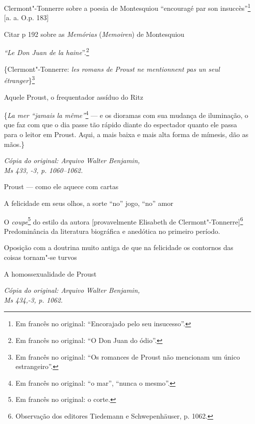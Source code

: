 Clermont"-Tonnerre sobre a poesia de Montesquiou ``encouragé par son
insuccès''\footnote{Em francês no original: ``Encorajado pelo seu insucesso''. \versal{[N.~T.]}} {[}a. a. O.p. 183{]}

Citar p 192 sobre as \emph{Memórias} (\emph{Memoiren}) de Montesquiou

\emph{``Le Don Juan de la haine}''.\footnote{Em francês no original: ``O Don Juan do ódio''. \versal{[N.~T.]}}

\{Clermont"-Tonnerre: \emph{les romans de Proust ne mentionnent pas un
seul étranger}\}\footnote{Em francês no original: ``Os romances
  de Proust não mencionam um único estrangeiro''. \versal{[N.~T.]}}

Aquele Proust, o frequentador assíduo do Ritz

\{\emph{La mer ``jamais la même''}\footnote{Em francês no original: ``o mar'', ``nunca o mesmo''. \versal{[N.~T.]}} --- e os dioramas com sua
mudança de iluminação, o que faz com que o dia passe tão rápido diante
do espectador quanto ele passa para o leitor em Proust. Aqui, a mais
baixa e mais alta forma de mímesis, dão as mãos.\}


\begin{flushright}
\emph{\footnotesize{Cópia do original: Arquivo Walter Benjamin,\\ Ms 433, -3, p. 1060--1062.}}
\end{flushright}

Proust --- como ele aquece com cartas

A felicidade em seus olhos, a sorte ``no'' jogo, ``no'' amor

O \emph{coupe}\footnote{Em francês no original: o corte. \versal{[N.~T.]}} do
estilo da autora {[}provavelmente Elisabeth de Clermont"-Tonnerre{]}\footnote{Observação dos editores Tiedemann e
  Schwepenhäuser, p. 1062. \versal{[N.~O.]}} Predominância da literatura biográfica e
anedótica no primeiro período.

Oposição com a doutrina muito antiga de que na felicidade os contornos
das coisas tornam"-se turvos

A homossexualidade de Proust

\begin{flushright}
\emph{\footnotesize{Cópia do original: Arquivo Walter Benjamin,\\ Ms 434,-3, p. 1062.}}
\end{flushright}


